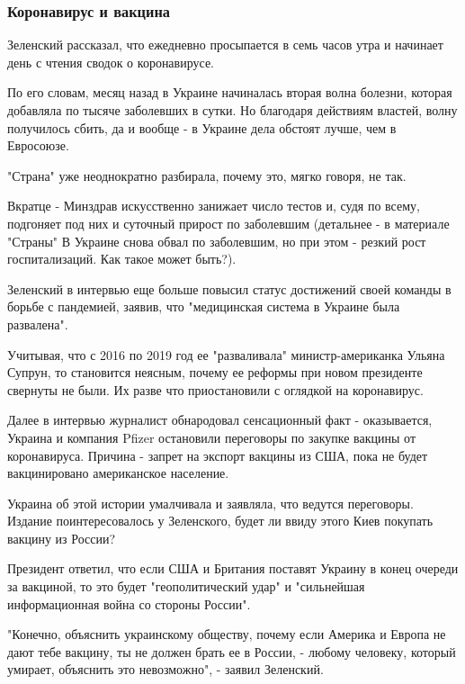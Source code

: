 {\subsubsection{Коронавирус и вакцина}

Зеленский рассказал, что ежедневно просыпается в семь часов утра и начинает
день с чтения сводок о коронавирусе.

По его словам, месяц назад в Украине начиналась вторая волна болезни, которая
добавляла по тысяче заболевших в сутки. Но благодаря действиям властей, волну
получилось сбить, да и вообще - в Украине дела обстоят лучше, чем в Евросоюзе.

"Страна" уже неоднократно разбирала, почему это, мягко говоря, не так.

Вкратце - Минздрав искусственно занижает число тестов и, судя по всему,
подгоняет под них и суточный прирост по заболевшим (детальнее - в материале
"Страны" В Украине снова обвал по заболевшим, но при этом - резкий рост
госпитализаций. Как такое может быть?).

Зеленский в интервью еще больше повысил статус достижений своей команды в
борьбе с пандемией, заявив, что "медицинская система в Украине была развалена".

Учитывая, что с 2016 по 2019 год ее "разваливала" министр-американка Ульяна
Супрун, то становится неясным, почему ее реформы при новом президенте свернуты
не были. Их разве что приостановили с оглядкой на коронавирус. 

Далее в интервью журналист обнародовал сенсационный факт - оказывается, Украина
и компания Pfizer остановили переговоры по закупке вакцины от коронавируса.
Причина - запрет на экспорт вакцины из США, пока не будет вакцинировано
американское население. 

Украина об этой истории умалчивала и заявляла, что ведутся переговоры. Издание
поинтересовалось у Зеленского, будет ли ввиду этого Киев покупать вакцину из
России? 

Президент ответил, что если США и Британия поставят Украину в конец очереди за
вакциной, то это будет "геополитический удар" и "сильнейшая информационная
война со стороны России". 

"Конечно, объяснить украинскому обществу, почему если Америка и Европа не дают
тебе вакцину, ты не должен брать ее в России, - любому человеку, который
умирает, объяснить это невозможно", - заявил Зеленский. 

}
